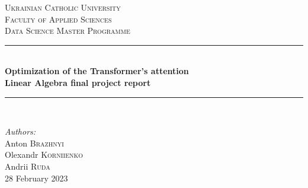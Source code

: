 \begin{titlepage}

\newcommand{\HRule}{\rule{\linewidth}{0.5mm}} %

\center %
 

\textsc{\LARGE Ukrainian Catholic University}\\[1cm] %
\textsc{\Large  Faculty of Applied Sciences}\\[0.5cm] %
\textsc{\large Data Science Master Programme}\\[0.5cm] %

\vspace*{1cm}

\HRule \\[0.4cm]
{ \huge \bfseries Optimization of the Transformer’s attention}\\[10pt]
{\Large \bfseries Linear Algebra final project report}\\[0.4cm] %
\HRule \\[0.8cm]
 
\vspace*{0.5cm}

\Large \emph{Authors:}\\
Anton \textsc{Brazhnyi}\\Olexandr \textsc{Korniienko}\\Andrii \textsc{Ruda}\\[1cm] %

\vspace*{1cm}
{\large 28 February 2023}\\[2cm] %


\end{titlepage}
